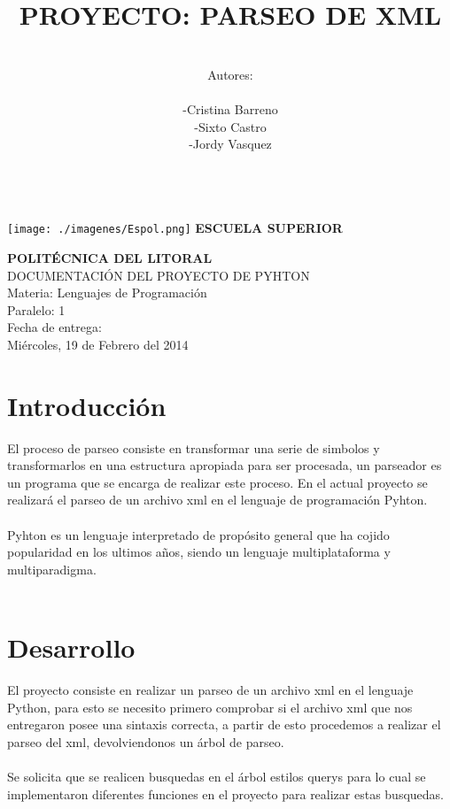 \documentclass[11pt]{article} %
\title{\fontsize{30}{0} \bf PROYECTO: PARSEO DE XML}
\author{\\Autores: \\  \\-Cristina Barreno \\ -Sixto Castro \\ -Jordy Vasquez\\ \\}
\begin{document}
\newpage

 \texttt{[image: ./imagenes/Espol.png]}{ \fontsize{18}{0} \bf ESCUELA SUPERIOR \\}
\begin{center}
{\fontsize{18}{0} \bf POLITÉCNICA DEL LITORAL\\}
\vspace{2cm}
{\LARGE{ DOCUMENTACIÓN DEL PROYECTO DE PYHTON }}\\
\vspace{2cm}
{\LARGE{ Materia: Lenguajes de Programación }}\\
\vspace{2cm}
{\LARGE{ Paralelo: 1}}\\
\vspace{2cm}
{\LARGE{Fecha de entrega: \\ Miércoles, 19 de Febrero del 2014}}
\thispagestyle{empty}
\end{center}


\maketitle



\newpage
\tableofcontents %
\thispagestyle{empty}

\newpage
\section{\fontsize{14}{0} \bf Introducción}
El proceso de parseo consiste en transformar una serie de simbolos y transformarlos en una estructura apropiada para ser procesada, un parseador es un programa que se encarga de realizar este proceso. En el actual proyecto se realizará el parseo de un archivo xml en el lenguaje de programación Pyhton.\\\\
Pyhton es un lenguaje interpretado de propósito general que ha cojido popularidad en los ultimos años, siendo un lenguaje multiplataforma y multiparadigma.\\\\

\section{\fontsize{14}{0} \bf Desarrollo}
El proyecto consiste en realizar un parseo de un archivo xml en el lenguaje Python, para esto se necesito primero comprobar si el archivo xml que nos entregaron posee una sintaxis correcta, a partir de esto procedemos a realizar el parseo  del xml, devolviendonos un árbol de parseo.\\\\
Se solicita que se realicen busquedas en el árbol estilos querys para lo cual se implementaron diferentes funciones en el proyecto para realizar estas busquedas.\\\\
\end{document}

